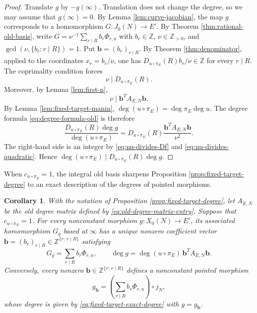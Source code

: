 \documentclass[12pt, letterpaper]{amsart}
\newtheorem{corollary}[theorem]{Corollary}
\theoremstyle{definition}
\theoremstyle{remark}
\newcommand{\Z}{\mathbb Z}
\numberwithin{equation}{section}
\begin{document}
\begin{proof}
Translate \(g\) by \(-g(\infty)\). Translation does not change the degree, so we
may assume that \(g(\infty)=0\). By Lemma \ref{lem:curve-jacobian}, the map \(g\)
corresponds to a homomorphism \(G:J_0(N)\to E'\). By Theorem
\ref{thm:rational-old-basis}, write
\(G=\nu^{-1}\sum_{r\mid R}b_r\Phi_{r,u}\) with \(b_r\in\Z\),
\(\nu\in\Z_{>0}\), and
\(\gcd(\nu,\{b_r:r\mid R\})=1\).
Put \(\boldsymbol b=(b_r)_{r\mid R}\).
By Theorem \ref{thm:denominator}, applied to
the coordinates \(x_r=b_r/\nu\), one has
\(D_{u\circ\pi_E}(R)b_r/\nu\in\Z\) for every \(r\mid R\). The coprimality
condition forces
\begin{equation}\label{eq:nu-divides-Df}
        \nu\mid D_{u\circ\pi_E}(R).
\end{equation}
Moreover, by Lemma \ref{lem:first-n},
\begin{equation}\label{eq:nu-divides-quadratic}
        \nu\mid\boldsymbol{b}^{T}A_{E,N}\boldsymbol{b}.
\end{equation}
By Lemma \ref{lem:fixed-target-manin}, \(\deg(u\circ\pi_E)=\deg\pi_E\deg u\).
The degree formula \eqref{eq:degree-formula-old} is therefore
\[
        \frac{D_{u\circ\pi_E}(R)\deg g}{\deg(u\circ\pi_E)}
        =
        D_{u\circ\pi_E}(R)
        \frac{\boldsymbol{b}^{T}A_{E,N}\boldsymbol{b}}{\nu^2}.
\]
The right-hand side is an integer by \eqref{eq:nu-divides-Df} and
\eqref{eq:nu-divides-quadratic}. Hence \(\deg(u\circ\pi_E)\mid D_{u\circ\pi_E}(R)\deg g\).
\end{proof}

When \(c_{u\circ\pi_E}=1\), the integral old basis sharpens
Proposition \ref{prop:fixed-target-degree} to an exact description of the
degrees of pointed morphisms.

\begin{corollary}\label{cor:fixed-target-degree-form}
With the notation of Proposition \ref{prop:fixed-target-degree}, let
\(A_{E,N}\) be the old degree matrix defined by
\eqref{eq:old-degree-matrix-entry}. Suppose that \(c_{u\circ\pi_E}=1\).
For every nonconstant morphism \(g:X_0(N)\to E'\), its associated
homomorphism \(G_g\) based at \(\infty\) has a unique nonzero coefficient
vector \(\boldsymbol b=(b_r)_{r\mid R}\in\Z^{\{r:\,r\mid R\}}\) satisfying
\begin{equation}\label{eq:fixed-target-exact-degree}
        G_g=\sum_{r\mid R}b_r\Phi_{r,u},
        \qquad
        \deg g=\deg(u\circ\pi_E)\,
        \boldsymbol b^{T}A_{E,N}\boldsymbol b.
\end{equation}
Conversely, every nonzero
\(\boldsymbol b\in\Z^{\{r:\,r\mid R\}}\) defines a nonconstant pointed morphism
\[
        g_{\boldsymbol b}
        =
        \left(\sum_{r\mid R}b_r\Phi_{r,u}\right)\circ j_N,
\]
whose degree is given by \eqref{eq:fixed-target-exact-degree} with
\(g=g_{\boldsymbol b}\).
\end{corollary}
\end{document}
